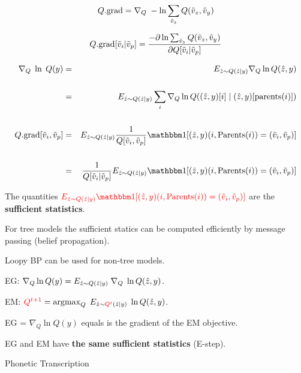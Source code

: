 {\vfill
$$Q.\mathrm{grad} = \nabla_Q \;- \ln \sum_{\tilde{v}_z} Q(\tilde{v}_z,\tilde{v}_y)$$

\vfill
$$Q.\mathrm{grad}[\tilde{v}_i|\tilde{v}_p] = \frac{- \partial \ln \sum_{\tilde{v}_z} Q(\tilde{v}_z,\tilde{v}_y)}{\partial Q[\tilde{v}_i|\tilde{v}_p]}$$


\begin{eqnarray*}
\nabla_Q \; \ln \; Q(y) & = & E_{\hat{z} \sim Q(\hat{z}|y)} \nabla_Q \ln Q(\hat{z},y) \\
\\
& = & E_{\hat{z} \sim Q(\hat{z}|y)} \sum_i \nabla_Q \ln Q((\hat{z},y)[i]\;|\; (\hat{z},y)[\mathrm{parents}(i)]) \\
\\
Q.\mathrm{grad}[\tilde{v}_i,\tilde{v}_p]& = & E_{\hat{z} \sim Q(\hat{z}|y)} \frac{1}{Q[\tilde{v}_i,\tilde{v}_p]} \bbone[(\hat{z},y)(i,\mathrm{Parents}(i)) = (\tilde{v}_i,\tilde{v}_p)] \\
\\
& = & \frac{1}{Q[\tilde{v}_i|\tilde{v}_p]} E_{\hat{z} \sim Q(\hat{z}|y)} \bbone[(\hat{z},y)(i,\mathrm{Parents}(i)) = (\tilde{v}_i,\tilde{v}_p)]
\end{eqnarray*}

\vfill
The quantities ${\color{red} E_{\hat{z} \sim Q(\hat{z}|y)} \bbone[(\hat{z},y)(i,\mathrm{Parents}(i)) = (\tilde{v}_i,\tilde{v}_p)]}$ are the {\bf sufficient statistics}.


For tree models the sufficient statics can be computed efficiently by message passing (belief propagation).

\vfill
Loopy BP can be used for non-tree models.


EG: \hspace{3ex} $\nabla_Q \ln Q(y) = E_{\hat{z} \sim Q(\hat{z}|y)}\;\nabla_Q \;\ln Q(\hat{z},y)$.

\vfill
EM: \hspace{3ex} ${\color{red} Q^{ t+1}} = \operatorname*{argmax}_Q \;E_{\hat{z} \sim {\color{red} Q^t}(\hat{z}|y)}\;\ln Q(\hat{z},y)$.

\vfill
EG = $\nabla_Q \ln Q(y)$ equals is the gradient of the EM objective.

\vfill
EG and EM have {\bf the same sufficient statistics} (E-step).

{Phonetic Transcription}

}
